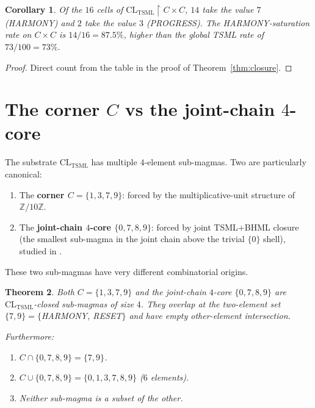 \documentclass[11pt,reqno]{amsart}
\theoremstyle{plain}
\newtheorem{theorem}{Theorem}[section]
\newtheorem{corollary}[theorem]{Corollary}
\theoremstyle{definition}
\theoremstyle{remark}
\newcommand{\Z}{\mathbb{Z}}
\newcommand{\TSML}{\mathrm{TSML}}
\begin{document}
\begin{corollary}\label{cor:harm-sat}
Of the $16$ cells of $\mathrm{CL}_\TSML \restriction C \times C$, $14$
take the value $7$ (HARMONY) and $2$ take the value $3$ (PROGRESS).
The HARMONY-saturation rate on $C \times C$ is $14/16 = 87.5\%$, higher
than the global TSML rate of $73/100 = 73\%$.
\end{corollary}

\begin{proof}
Direct count from the table in the proof of Theorem~\ref{thm:closure}.
\end{proof}

\section{The corner $C$ vs the joint-chain $4$-core}
\label{sec:vs4core}

The substrate $\mathrm{CL}_\TSML$ has multiple $4$-element sub-magmas.
Two are particularly canonical:

\begin{enumerate}
\item The \textbf{corner $C = \{1, 3, 7, 9\}$}: forced by the
multiplicative-unit structure of $\Z/10\Z$.
\item The \textbf{joint-chain $4$-core $\{0, 7, 8, 9\}$}: forced by
joint TSML+BHML closure (the smallest sub-magma in the joint chain
above the trivial $\{0\}$ shell), studied in
\cite{SandersGishFourCore}.
\end{enumerate}

These two sub-magmas have very different combinatorial origins.

\begin{theorem}\label{thm:two-cores}
Both $C = \{1, 3, 7, 9\}$ and the joint-chain $4$-core
$\{0, 7, 8, 9\}$ are $\mathrm{CL}_\TSML$-closed sub-magmas of size $4$.
They overlap at the two-element set $\{7, 9\} = \{$HARMONY, RESET$\}$
and have empty other-element intersection.

Furthermore:
\begin{enumerate}
\item $C \cap \{0, 7, 8, 9\} = \{7, 9\}$.
\item $C \cup \{0, 7, 8, 9\} = \{0, 1, 3, 7, 8, 9\}$ ($6$ elements).
\item Neither sub-magma is a subset of the other.
\end{enumerate}
\end{theorem}
\end{document}
